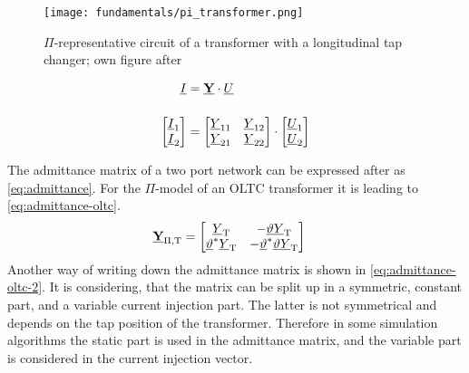 \begin{figure}[htb!]
    \centering
    \texttt{[image: fundamentals/pi\_transformer.png]}
    \caption[$\Pi$-representative circuit of a transformer with a longitudinal tap changer]{$\Pi$-representative circuit of a transformer with a longitudinal tap changer; own figure after \autocite{machowskiPowerSystemDynamics2020,burlakinEnhancedVoltageControl2024}}
    \label{fig:pi-transformer}
\end{figure}

\begin{align}
    \underline{I}&=\underline{\mathrm{\textbf{Y}}} \cdot \underline{U} \notag \\[12pt]
    \begin{bmatrix}
        \underline{I}_1 \\
        \underline{I}_2
    \end{bmatrix}&= 
    \begin{bmatrix}
        \underline{Y}_{11} & \underline{Y}_{12} \\
        \underline{Y}_{21} & \underline{Y}_{22}
    \end{bmatrix} \cdot
    \begin{bmatrix}
        \underline{U}_1 \\
        \underline{U}_2
    \end{bmatrix} \label{eq:admittance}
\end{align}

The admittance matrix of a two port network can be expressed after \textcite{machowskiPowerSystemDynamics2020} as \autoref{eq:admittance}. For the $\Pi$-model of an \acs{OLTC} transformer it is leading to \autoref{eq:admittance-oltc}.
\begin{align}
    \underline{\mathrm{\textbf{Y}}}_\mathrm{\Pi,T}&= 
    \begin{bmatrix}
        \underline{Y}_\mathrm{T} & -\underline{\vartheta}\underline{Y}_\mathrm{T} \\
        \underline{\vartheta}^*\underline{Y}_\mathrm{T} & -\underline{\vartheta}^*\underline{\vartheta}\underline{Y}_\mathrm{T}
    \end{bmatrix} \label{eq:admittance-oltc}
\end{align}
Another way of writing down the admittance matrix is shown in \autoref{eq:admittance-oltc-2}. It is considering, that the matrix can be split up in a symmetric, constant part, and a variable current injection part. The latter is not symmetrical and depends on the tap position of the transformer. Therefore in some simulation algorithms the static part is used in the admittance matrix, and the variable part is considered in the current injection vector. \autocite{machowskiPowerSystemDynamics2020}

